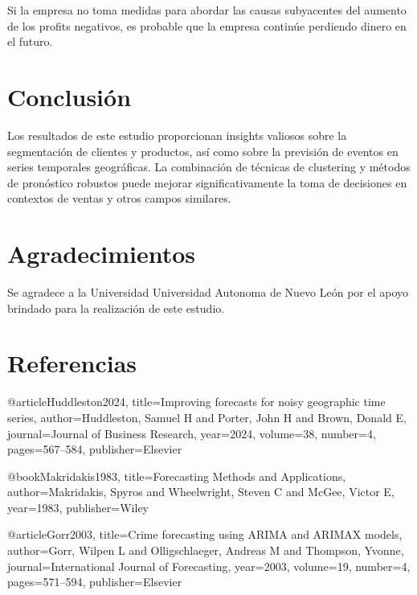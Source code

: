 \documentclass[preprint,12pt]{elsarticle}
\begin{document}
Si la empresa no toma medidas para abordar las causas subyacentes del aumento de los profits negativos, es probable que la empresa continúe perdiendo dinero en el futuro.

\section{Conclusión}
Los resultados de este estudio proporcionan insights valiosos sobre la segmentación de clientes y productos, así como sobre la previsión de eventos en series temporales geográficas. La combinación de técnicas de clustering y métodos de pronóstico robustos puede mejorar significativamente la toma de decisiones en contextos de ventas y otros campos similares.

\section*{Agradecimientos}
Se agradece a la Universidad Universidad Autonoma de Nuevo León por el apoyo brindado para la realización de este estudio.

\section*{Referencias}



@article{Huddleston2024,
  title={Improving forecasts for noisy geographic time series},
  author={Huddleston, Samuel H and Porter, John H and Brown, Donald E},
  journal={Journal of Business Research},
  year={2024},
  volume={38},
  number={4},
  pages={567--584},
  publisher={Elsevier}
}

@book{Makridakis1983,
  title={Forecasting Methods and Applications},
  author={Makridakis, Spyros and Wheelwright, Steven C and McGee, Victor E},
  year={1983},
  publisher={Wiley}
}

@article{Gorr2003,
  title={Crime forecasting using ARIMA and ARIMAX models},
  author={Gorr, Wilpen L and Olligschlaeger, Andreas M and Thompson, Yvonne},
  journal={International Journal of Forecasting},
  year={2003},
  volume={19},
  number={4},
  pages={571--594},
  publisher={Elsevier}
}
\end{document}
